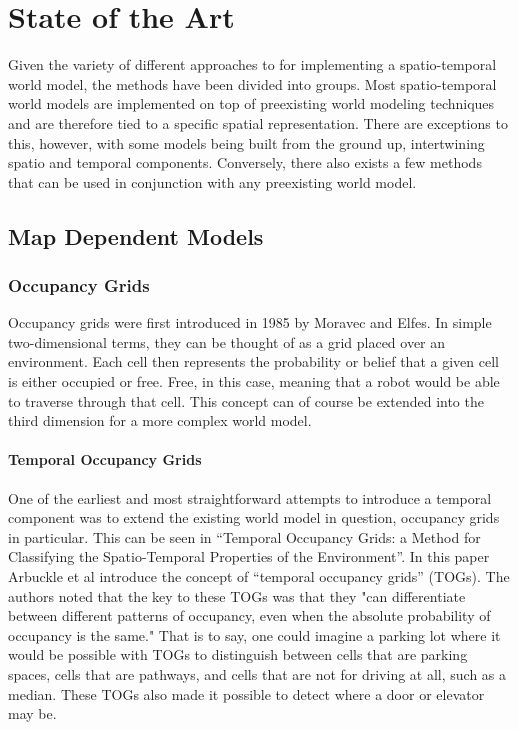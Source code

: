 
  \chapter{ State of the Art }

  Given the variety of different approaches to for implementing a spatio-temporal
  world model, the methods have been divided into groups. Most spatio-temporal
  world models are implemented on top of preexisting world modeling techniques
  and are therefore tied to a specific spatial
  representation. There are exceptions to this, however, with some models
  being built from the ground up, intertwining spatio and temporal components.
  Conversely, there also exists a few
  methods that can be used in conjunction with any preexisting world model.


  \section{ Map Dependent Models }

  \subsection{ Occupancy Grids }

  Occupancy grids were first introduced in 1985 by Moravec and Elfes. \cite{Elfes1985}
  In simple two-dimensional terms, they can be thought of as a grid placed
  over an environment. Each cell then represents the probability or belief that
  a given cell is either occupied or free. Free, in this case, meaning
  that a robot would be able to traverse through that cell. This concept can of
  course be extended into the third dimension for a more complex world model. \\

  \subsubsection{ Temporal Occupancy Grids }
  One of the earliest and most straightforward attempts to introduce a temporal
  component was to extend the existing world model in question, occupancy
  grids in particular. This can be seen in ``Temporal Occupancy Grids: a Method for
  Classifying the Spatio-Temporal Properties of the Environment''.
  \cite{Arbuckle2002} In this paper Arbuckle et al introduce the concept of
  ``temporal occupancy grids'' (TOGs). The authors noted that the key to these TOGs
  was that they "can differentiate between different patterns of occupancy, even
  when the absolute probability of occupancy is the same." That is to say, one
  could imagine a parking lot where it would be possible with TOGs to distinguish
  between cells that are parking spaces, cells that are pathways, and cells that
  are not for driving at all, such as a median. These TOGs also made it
  possible to detect where a door or elevator may be. \\

